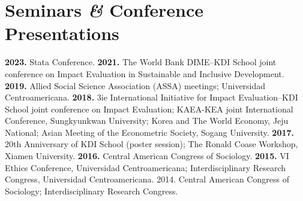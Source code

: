 \documentclass[a4paper, 10pt]{article}
\renewenvironment{itemize}{
  \begin{list}{}
    { \setlength{\itemsep}{5pt}
      \setlength{\parsep}{0pt}
      \setlength{\topsep}{0pt}
      \setlength{\leftmargin}{0em} } }{
  \end{list}}
\begin{document}

\section*{Seminars \textit{\&} Conference Presentations}

\begin{itemize}
  \item \textbf{2023.} Stata Conference. \textbf{2021.} The World Bank DIME--KDI School joint conference on Impact Evaluation in Sustainable and Inclusive Development. \textbf{2019.} Allied Social Science Association (ASSA) meetings; Universidad Centroamericana. \textbf{2018.} 3ie International Initiative for Impact Evaluation--KDI School joint conference on Impact Evaluation; KAEA-KEA joint International Conference, Sungkyunkwan University; Korea and The World Economy, Jeju National; Asian Meeting of the Econometric Society, Sogang University. \textbf{2017.} 20th Anniversary of KDI School (poster session); The Ronald Coase Workshop, Xiamen University. \textbf{2016.} Central American Congress of Sociology. \textbf{2015.} VI Ethics Conference, Universidad Centroamericana; Interdisciplinary Research Congress, Universidad Centroamericana. 2014. Central American Congress of Sociology; Interdisciplinary Research Congress.
\end{itemize}

\end{document}
